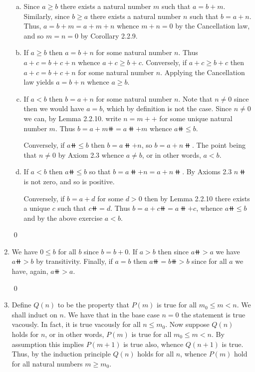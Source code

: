 \begin{enumerate}[Ex. 2.2.1.]
\begin{enumerate}[(a)]
        \item Since $a \geq b$ there exists a natural number $m$ such that
        $a = b + m$. Similarly, since $b \geq a$ there exists a natural number
        $n$ such that $b = a + n$. Thus, $a = b + m = a + m + n$ whence
        $m + n = 0$ by the Cancellation law, and so $m = n = 0$ by Corollary
        2.2.9.

        \item If $a \geq b$ then $a = b + n$ for some natural number $n$. Thus
        $a + c = b + c + n$ whence $a + c \geq b + c$. Conversely, if
        $a + c \geq b + c$ then $a + c = b + c + n$ for some natural 
        number $n$.  Applying the Cancellation law yields $a = b + n$ 
        whence $a \geq b$.

        \item If $a < b$ then $b = a + n$ for some natural number $n$. Note that
        $n \neq 0$ since then we would have $a = b$, which by definition is not
        the case. Since $n \neq 0$ we can, by Lemma 2.2.10. write $n = m++$ for
        some unique natural number $m$. Thus $b = a + m\doubleplus = 
        a\doubleplus + m$ whence $a\doubleplus \leq b$.

        Conversely, if $a\doubleplus \leq b$ then $b = a\doubleplus + n$, so
        $b = a + n\doubleplus$. The point being that $n \neq 0$ by Axiom 2.3
        whence $a \neq b$, or in other words, $a < b$.

        \item If $a < b$ then $a\doubleplus \leq b$ so that $b = a\doubleplus
        + n = a + n\doubleplus$. By Axioms 2.3 $n\doubleplus$ is not zero, and
        so is positive.

        Conversely, if $b = a + d$ for some $d > 0$ then by Lemma 2.2.10 there
        exists a unique $c$ such that $c\doubleplus = d$. Thus $b = a + 
        c\doubleplus = a\doubleplus + c$, whence $a\doubleplus \leq b$ and by 
        the above exercise $a < b$.
    \end{enumerate}

    \qed

    \item We have $0 \leq b$ for all $b$ since $b = b + 0$. If $a > b$ then
    since $a\doubleplus > a$ we have $a\doubleplus > b$ by transitivity.
    Finally, if $a = b$ then $a\doubleplus = b\doubleplus > b$ since for all
    $a$ we have, again, $a\doubleplus > a$.

    \qed

    \item Define $Q(n)$ to be the property that $P(m)$ is true for all 
    $m_0 \leq m < n$. We shall induct on $n$. We have that in the base
    case $n = 0$ the statement is true vacously. In fact, it is true
    vacously for all $n \leq m_0$. Now suppose $Q(n)$ holds for $n$, or in 
    other words, $P(m)$ is true for all $m_0 \leq m < n$. By assumption this 
    implies $P(m+1)$ is true also, whence $Q(n+1)$ is true. Thus, by the
    induction principle $Q(n)$ holds for all $n$, whence $P(m)$ hold for all
    natural numbers $m \geq m_0$.


\end{enumerate}

